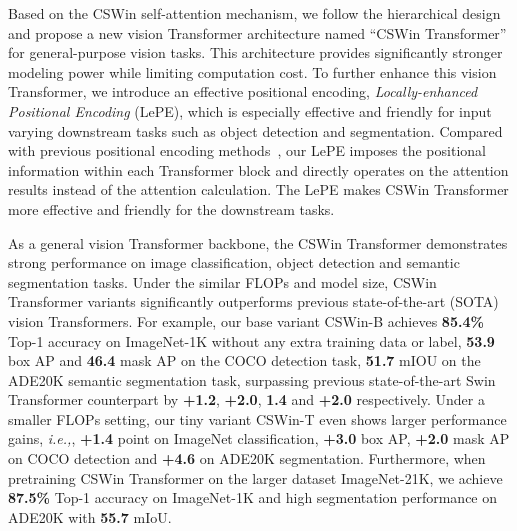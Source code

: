 \documentclass[10pt,twocolumn,letterpaper]{article}
\begin{document}
Based on the CSWin self-attention mechanism, we follow the hierarchical design and propose a new vision Transformer architecture named ``CSWin Transformer'' for general-purpose vision tasks. This architecture provides significantly stronger modeling power while limiting computation cost. To further enhance this vision Transformer, we introduce an effective positional encoding, \emph{Locally-enhanced Positional Encoding} (LePE), which is especially effective and friendly for input varying downstream tasks such as object detection and segmentation. Compared with previous positional encoding methods~\cite{vaswani2017attention, shaw2018self, chu2021conditional}, our LePE imposes the positional information within each Transformer block and directly operates on the attention results instead of the attention calculation. The LePE makes CSWin Transformer more effective and friendly for the downstream tasks. 



As a general vision Transformer backbone, the CSWin Transformer demonstrates  strong performance on image classification, object detection and semantic segmentation tasks. Under the similar FLOPs and model size, CSWin Transformer variants significantly outperforms previous state-of-the-art (SOTA) vision Transformers. For example, our base variant CSWin-B achieves \textbf{85.4\%} Top-1 accuracy on ImageNet-1K without any extra training data or label, \textbf{53.9} box AP and \textbf{46.4} mask AP on the COCO detection task, \textbf{51.7} mIOU on the ADE20K semantic segmentation task, surpassing previous state-of-the-art Swin Transformer counterpart by \textbf{+1.2}, \textbf{+2.0}, \textbf{1.4} and \textbf{+2.0} respectively. Under a smaller FLOPs setting, our tiny variant CSWin-T even shows larger performance gains, \textit{i.e.,},  \textbf{+1.4} point on ImageNet classification, \textbf{+3.0} box AP, \textbf{+2.0} mask AP on COCO detection and \textbf{+4.6} on ADE20K segmentation. Furthermore, when pretraining CSWin Transformer on the larger dataset ImageNet-21K, we achieve \textbf{87.5\%} Top-1 accuracy on ImageNet-1K and high segmentation performance on ADE20K with \textbf{55.7} mIoU.



\vspace{-1mm}
\end{document}
